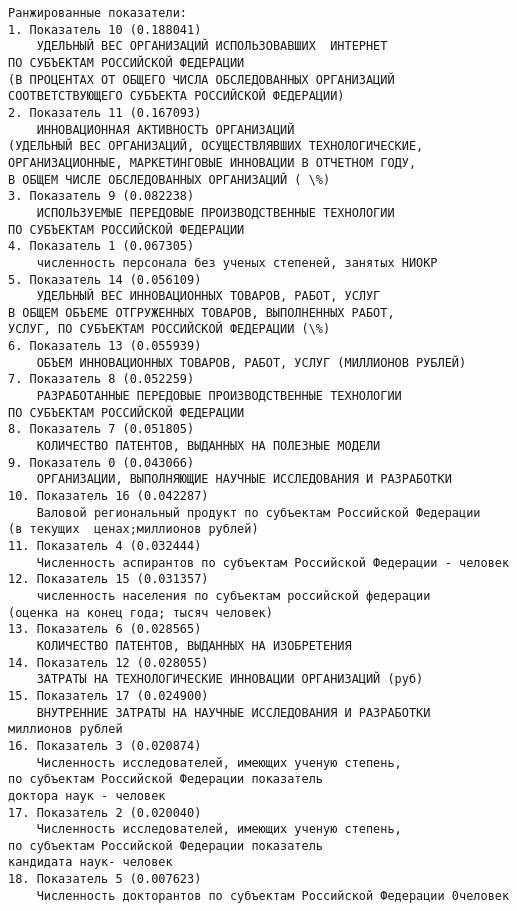 \documentclass[11pt]{article}
\begin{document}
    \begin{Verbatim}[commandchars=\\\{\}]
Ранжированные показатели:
1. Показатель 10 (0.188041)
	УДЕЛЬНЫЙ ВЕС ОРГАНИЗАЦИЙ ИСПОЛЬЗОВАВШИХ  ИНТЕРНЕТ
ПО СУБЪЕКТАМ РОССИЙСКОЙ ФЕДЕРАЦИИ
(В ПРОЦЕНТАХ ОТ ОБЩЕГО ЧИСЛА ОБСЛЕДОВАННЫХ ОРГАНИЗАЦИЙ
СООТВЕТСТВУЮЩЕГО СУБЪЕКТА РОССИЙСКОЙ ФЕДЕРАЦИИ)
2. Показатель 11 (0.167093)
	ИННОВАЦИОННАЯ АКТИВНОСТЬ ОРГАНИЗАЦИЙ
(УДЕЛЬНЫЙ ВЕС ОРГАНИЗАЦИЙ, ОСУЩЕСТВЛЯВШИХ ТЕХНОЛОГИЧЕСКИЕ,
ОРГАНИЗАЦИОННЫЕ, МАРКЕТИНГОВЫЕ ИННОВАЦИИ В ОТЧЕТНОМ ГОДУ,
В ОБЩЕМ ЧИСЛЕ ОБСЛЕДОВАННЫХ ОРГАНИЗАЦИЙ ( \%)
3. Показатель 9 (0.082238)
	ИСПОЛЬЗУЕМЫЕ ПЕРЕДОВЫЕ ПРОИЗВОДСТВЕННЫЕ ТЕХНОЛОГИИ
ПО СУБЪЕКТАМ РОССИЙСКОЙ ФЕДЕРАЦИИ
4. Показатель 1 (0.067305)
	численность персонала без ученых степеней, занятых НИОКР
5. Показатель 14 (0.056109)
	УДЕЛЬНЫЙ ВЕС ИННОВАЦИОННЫХ ТОВАРОВ, РАБОТ, УСЛУГ
В ОБЩЕМ ОБЪЕМЕ ОТГРУЖЕННЫХ ТОВАРОВ, ВЫПОЛНЕННЫХ РАБОТ,
УСЛУГ, ПО СУБЪЕКТАМ РОССИЙСКОЙ ФЕДЕРАЦИИ (\%)
6. Показатель 13 (0.055939)
	ОБЪЕМ ИННОВАЦИОННЫХ ТОВАРОВ, РАБОТ, УСЛУГ (МИЛЛИОНОВ РУБЛЕЙ)
7. Показатель 8 (0.052259)
	РАЗРАБОТАННЫЕ ПЕРЕДОВЫЕ ПРОИЗВОДСТВЕННЫЕ ТЕХНОЛОГИИ
ПО СУБЪЕКТАМ РОССИЙСКОЙ ФЕДЕРАЦИИ
8. Показатель 7 (0.051805)
	КОЛИЧЕСТВО ПАТЕНТОВ, ВЫДАННЫХ НА ПОЛЕЗНЫЕ МОДЕЛИ
9. Показатель 0 (0.043066)
	ОРГАНИЗАЦИИ, ВЫПОЛНЯЮЩИЕ НАУЧНЫЕ ИССЛЕДОВАНИЯ И РАЗРАБОТКИ
10. Показатель 16 (0.042287)
	Валовой региональный продукт по субъектам Российской Федерации
(в текущих  ценах;миллионов рублей)
11. Показатель 4 (0.032444)
	Численность аспирантов по субъектам Российской Федерации - человек
12. Показатель 15 (0.031357)
	численность населения по субъектам российской федерации
(оценка на конец года; тысяч человек)
13. Показатель 6 (0.028565)
	КОЛИЧЕСТВО ПАТЕНТОВ, ВЫДАННЫХ НА ИЗОБРЕТЕНИЯ
14. Показатель 12 (0.028055)
	ЗАТРАТЫ НА ТЕХНОЛОГИЧЕСКИЕ ИННОВАЦИИ ОРГАНИЗАЦИЙ (руб)
15. Показатель 17 (0.024900)
	ВНУТРЕННИЕ ЗАТРАТЫ НА НАУЧНЫЕ ИССЛЕДОВАНИЯ И РАЗРАБОТКИ
миллионов рублей
16. Показатель 3 (0.020874)
	Численность исследователей, имеющих ученую степень,
по субъектам Российской Федерации показатель
доктора наук - человек
17. Показатель 2 (0.020040)
	Численность исследователей, имеющих ученую степень,
по субъектам Российской Федерации показатель
кандидата наук- человек
18. Показатель 5 (0.007623)
	Численность докторантов по субъектам Российской Федерации 0человек

    \end{Verbatim}

    \begin{center}
    \end{center}
    { \hspace*{\fill} \\}
    
\end{document}
